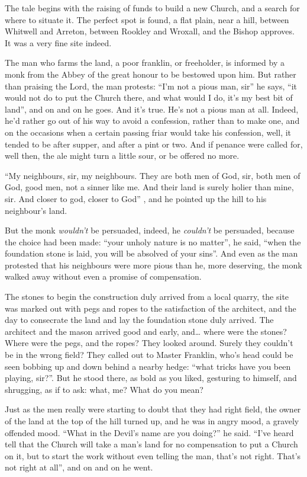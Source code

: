\documentclass[
  12pt,
  a5paper,
  twoside]{book}
\begin{document}
The tale begins with the raising of funds to build a new Church, and a
search for where to situate it. The perfect spot is found, a flat plain,
near a hill, between Whitwell and Arreton, between Rookley and Wroxall,
and the Bishop approves. It was a very fine site indeed.

The man who farms the land, a poor franklin, or freeholder, is informed
by a monk from the Abbey of the great honour to be bestowed upon him.
But rather than praising the Lord, the man protests: ``I'm not a pious
man, sir'' he says, ``it would not do to put the Church there, and what
would I do, it's my best bit of land'', and on and on he goes. And it's
true. He's not a pious man at all. Indeed, he'd rather go out of his way
to avoid a confession, rather than to make one, and on the occasions
when a certain passing friar would take his confession, well, it tended
to be after supper, and after a pint or two. And if penance were called
for, well then, the ale might turn a little sour, or be offered no more.

``My neighbours, sir, my neighbours. They are both men of God, sir, both
men of God, good men, not a sinner like me. And their land is surely
holier than mine, sir. And closer to god, closer to God'' , and he
pointed up the hill to his neighbour's land.

But the monk \emph{wouldn't} be persuaded, indeed, he \emph{couldn't} be
persuaded, because the choice had been made: ``your unholy nature is no
matter'', he said, ``when the foundation stone is laid, you will be
absolved of your sins''. And even as the man protested that his
neighbours were more pious than he, more deserving, the monk walked away
without even a promise of compensation.

The stones to begin the construction duly arrived from a local quarry,
the site was marked out with pegs and ropes to the satisfaction of the
architect, and the day to consecrate the land and lay the foundation
stone duly arrived. The architect and the mason arrived good and early,
and\ldots{} where were the stones? Where were the pegs, and the ropes?
They looked around. Surely they couldn't be in the wrong field? They
called out to Master Franklin, who's head could be seen bobbing up and
down behind a nearby hedge: ``what tricks have you been playing, sir?''.
But he stood there, as bold as you liked, gesturing to himself, and
shrugging, as if to ask: what, me? What do you mean?

Just as the men really were starting to doubt that they had right field,
the owner of the land at the top of the hill turned up, and he was in
angry mood, a gravely offended mood. ``What in the Devil's name are you
doing?'' he said. ``I've heard tell that the Church will take a man's
land for no compensation to put a Church on it, but to start the work
without even telling the man, that's not right. That's not right at
all'', and on and on he went.
\end{document}
